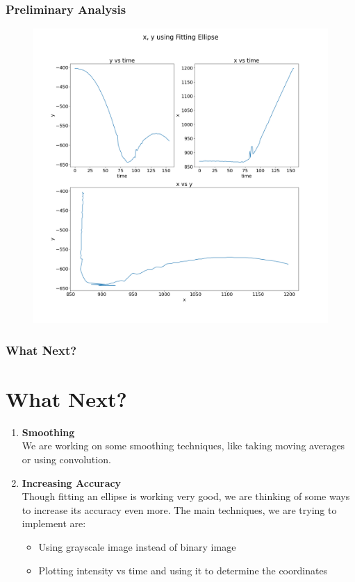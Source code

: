 \documentclass{beamer}
\begin{document}
\begin{frame}
    \frametitle{Preliminary Analysis}
    \begin{figure}
        \centering
        \includegraphics[scale=0.2]{x_y_using_ap.png}
    \end{figure}
\end{frame}
\begin{frame}
    \frametitle{What Next?}
    \section{What Next?}
    \begin{enumerate}
        \item <1-> \textbf{Smoothing}\\
              We are working on some smoothing techniques, like taking moving averages or using convolution.
        \item <2-> \textbf{Increasing Accuracy}\\
              Though fitting an ellipse is working very good, we are thinking of some ways to increase its accuracy even more. The main techniques, we are trying to implement are:
              \begin{itemize}
                  \item Using grayscale image instead of binary image
                  \item Plotting intensity vs time and using it to determine the coordinates
              \end{itemize}
    \end{enumerate}
\end{frame}
\end{document}
